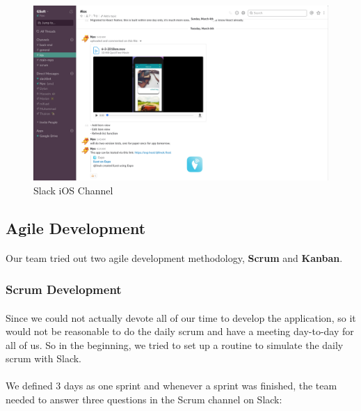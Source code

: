 \documentclass[12pt,a4paper]{article}
\begin{document}
        \begin{figure}[H]
          \centering
          \includegraphics[width=1\textwidth]{../assets/development-records-slack-ios-channel.png}
          \caption{Slack iOS Channel}
          \label{fig:Slack iOS Channel}
        \end{figure}

      \subsection{Agile Development} 
        
        \paragraph{}Our team tried out two agile development methodology, {\bf Scrum} and {\bf Kanban}.

        \subsubsection{Scrum Development}
          \paragraph{}Since we could not actually devote all of our time to develop the application, so it would not be reasonable to do the daily scrum and have a meeting day-to-day for all of us. So in the beginning, we tried to set up a routine to simulate the daily scrum with Slack.

          \paragraph{}We defined 3 days as one sprint and whenever a sprint was finished, the team needed to answer three questions in the Scrum channel on Slack:
          
\end{document}
